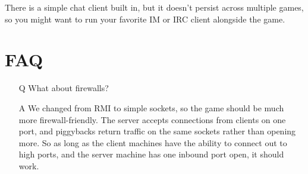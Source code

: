 \documentclass{article}
\begin{document}
There is a simple chat client built in, but it doesn't persist across
multiple games, so you might want to run your favorite IM or IRC client
alongside the game.

\section{FAQ}

\begin{itemize}

\item[Q] What about firewalls?

\item[A] We changed from RMI to simple sockets, so the game should be
much more firewall-friendly.  The server accepts connections from 
clients on one port, and piggybacks return traffic on the same sockets
rather than opening more.  So as long as the client machines have the
ability to connect out to high ports, and the server machine has one
inbound port open, it should work.

\end{itemize}
\end{document}
